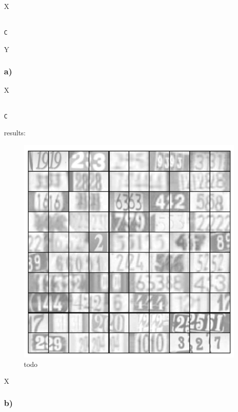 X

\begin{lstlisting}[caption=todo]

C

\end{lstlisting}

Y


\subsubsection{a)}

X

\begin{lstlisting}[caption=todo]

C

\end{lstlisting}


results:

\begin{figure}[!ht]
\includegraphics[width=1\textwidth]{chapters/images/figure-3-7-a}
\caption{todo}
\end{figure}

X



\subsubsection{b)}

